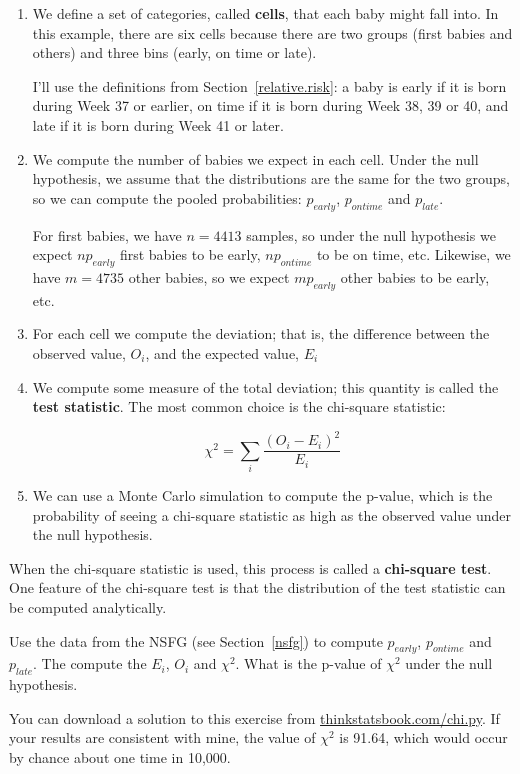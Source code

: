 \documentclass[12pt]{book}
\begin{document}
\begin{enumerate}

\item We define a set of categories, called {\bf cells}, that each
  baby might fall into.  In this example, there are six cells because
  there are two groups (first babies and others) and three bins
  (early, on time or late).

I'll use the definitions from Section~\ref{relative.risk}: a baby is
early if it is born during Week 37 or earlier, on time if it is born
during Week 38, 39 or 40, and late if it is born during Week 41 or
later.

\item We compute the number of babies we expect in each cell.  Under
  the null hypothesis, we assume that the distributions are the same
  for the two groups, so we can compute the pooled probabilities:
  $p_{early}$, $p_{ontime}$ and $p_{late}$.

For first babies, we have $n=4413$ samples, so under the null hypothesis
we expect $n p_{early}$ first babies to be early, $n p_{ontime}$ to be
on time, etc.  Likewise, we have $m=4735$ other babies, so we expect
$m p_{early}$ other babies to be early, etc.

\item For each cell we compute the deviation; that is, the difference
  between the observed value, $O_i$, and the expected value, $E_i$

\item We compute some measure of the total deviation; this quantity
is called the {\bf test statistic}.  The most common
choice is the chi-square statistic:

  \[ \chi^2 = \sum_i \frac{(O_i - E_i)^2}{E_i} \]


\item We can use a Monte Carlo simulation to compute the p-value,
  which is the probability of seeing a chi-square statistic as high
  as the observed value under the null hypothesis.

\end{enumerate}

When the chi-square statistic is used, this process is called a 
{\bf chi-square test}.  One feature of the chi-square test is that
the distribution of the test statistic can be computed analytically.

\begin{ex}

Use the data from the NSFG (see Section~\ref{nsfg}) to compute
$p_{early}$, $p_{ontime}$ and $p_{late}$.  The compute the $E_i$,
$O_i$ and $\chi^2$.  What is the p-value of $\chi^2$ under the null
hypothesis.

You can download a solution to this exercise from
\url{thinkstatsbook.com/chi.py}.
If your results are consistent with mine, the value of $\chi^2$ is 91.64,
which would occur by chance about one time in 10,000.

\end{ex}
\end{document}
